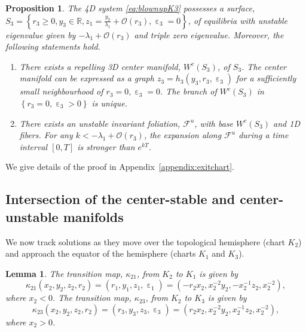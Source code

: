 \documentclass[10pt,onecolumn]{article}
\theoremstyle{plain}
\newtheorem{proposition}{Proposition}[section]
\newtheorem{lemma}{Lemma}[section]
\DeclareMathOperator{\eps}{\varepsilon}
\begin{document}
\begin{proposition}  \label{prop:exitchart}
The 4D system \eqref{eq:blownupK3} possesses a surface, $S_3 = \left\{ r_3 \geq 0, y_3 \in \mathbb R, z_1 = \tfrac{y_3}{\lambda_1}+\mathcal O(r_3), \eps_3 = 0 \right\}$, of equilibria with unstable eigenvalue given by $-\lambda_1 + \mathcal O(r_3)$ and triple zero eigenvalue. Moreover, the following statements hold. 
\begin{enumerate}[label=(\roman*)]
  \item There exists a repelling 3D center manifold, $W^c(S_3)$, of $S_3$. The center manifold can be expressed as a graph $z_3 = h_3(y_3,r_3,\eps_3)$ for a sufficiently small neighbourhood of $r_3=0,\eps_3=0$. The branch of $W^c(S_3)$ in $\left\{ r_3 =0, \eps_3>0 \right\}$ is unique. 
  \item There exists an unstable invariant foliation, $\mathcal F^u$, with base $W^c(S_3)$ and 1D fibers. For any $k < -\lambda_1 + \mathcal O(r_3)$, the expansion along $\mathcal F^u$ during a time interval $[0,T]$ is stronger than $e^{kT}$.
\end{enumerate}
\end{proposition}

We give details of the proof in Appendix~\ref{appendix:exitchart}.

\subsection{Intersection of the center-stable and center-unstable manifolds}   \label{subsec:transitionmaps}
We now track solutions as they move over the topological hemisphere (chart $K_2$) and approach the equator of the hemisphere (charts $K_1$ and $K_3$). 

\begin{lemma}  \label{lemma:transitionmaps}
The transition map, $\kappa_{21}$, from $K_2$ to $K_1$ is given by 
%
\[ \kappa_{21}\left( x_2,y_2,z_2,r_2 \right) = (r_1,y_1,z_1,\eps_1) = \left( -r_2 x_2, x_2^{-2} y_2, -x_2^{-1}z_2, x_2^{-2} \right), \]
%
where $x_2<0$.  The transition map, $\kappa_{23}$, from $K_2$ to $K_3$ is given by
%
\[ \kappa_{23}\left( x_2,y_2,z_2,r_2 \right) = (r_3,y_3,z_3,\eps_3) = \left( r_2 x_2, x_2^{-2}y_2, x_2^{-1}z_2, x_2^{-2} \right),   \]
%
where $x_2 > 0$.
\end{lemma}
\end{document}
